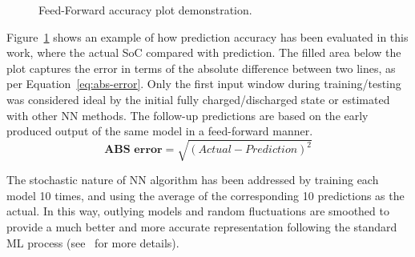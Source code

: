 %
%
 {
\begin{figure}[ht]
    \centering
    
    \caption{Feed-Forward accuracy plot demonstration.}
    \label{fig:plot_demo}
\end{figure}
Figure~\ref{fig:plot_demo} shows an example of how prediction accuracy has been evaluated in this work, where the actual SoC compared with prediction.
The filled area below the plot captures the error in terms of the absolute difference between two lines, as per Equation~\ref{eq:abs-error}.
Only the first input window during training/testing was considered ideal by the initial fully charged/discharged state or estimated with other NN methods.
The follow-up predictions are based on the early produced output of the same model in a feed-forward manner.
\begin{equation}
    \textbf{ABS error}  = \sqrt{(Actual-Prediction)^2}
    \label{eq:abs-error}
\end{equation}
}
{The stochastic nature of NN algorithm has been addressed by training each model 10 times, and using the average of the corresponding 10 predictions as the actual.
In this way, outlying models and random fluctuations are smoothed to provide a much better and more accurate representation following the standard ML process (see~\cite{sadykov_practical_2022} for more details).}

